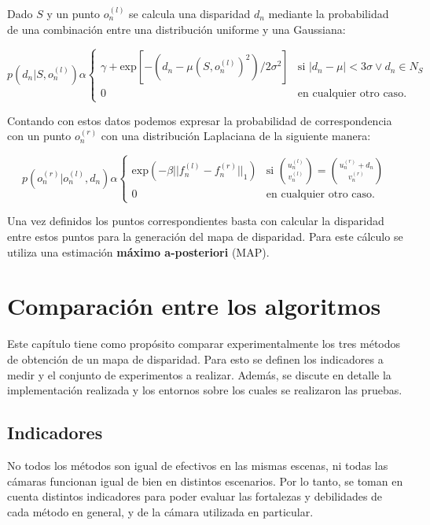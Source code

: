 \documentclass[11pt,a4paper,titlepage]{article}
\begin{document}
Dado $S$ y un punto $o_n^{(l)}$ se calcula una disparidad $d_n$ mediante la probabilidad de una combinación entre una distribución uniforme y una Gaussiana:

\[
	p(d_{n}|S,o_{n}^{(l)})\alpha
	\begin{cases}
	  \gamma + \text{exp} [ - (d_{n} - \mu(S,o_{n}^{(l)})^{2}) / 2 \sigma^{2} ] & \text{si } |d_{n} - \mu| < 3\sigma \vee d_{n} \in N_{S} \\
	  0 & \text{en cualquier otro caso}.
	\end{cases}
\]


Contando con estos datos podemos expresar la probabilidad de correspondencia con un punto $o_n^{(r)}$ con una distribución Laplaciana de la siguiente manera:

\[
	p(o_{n}^{(r)}|o_{n}^{(l)},d_{n})\alpha
	\begin{cases}
	  \text{exp} ( - \beta || f_{n}^{(l)} - f_{n}^{(r)} ||_{1}) & \text{si } \binom{u_{n}^{(l)}}{v_{n}^{(l)}} = \binom{u_{n}^{(r)} + d_{n}}{v_{n}^{(r)}}\\
	  0 & \text{en cualquier otro caso}.
	\end{cases}
\]

Una vez definidos los puntos correspondientes basta con calcular la disparidad entre estos puntos para la generación del mapa de disparidad. Para este cálculo se utiliza una estimación \textbf{máximo a-posteriori} (MAP).

\newpage

\section{Comparación entre los algoritmos}

Este capítulo tiene como propósito comparar experimentalmente los tres métodos de obtención de un mapa de disparidad. Para esto se definen los indicadores a medir y el conjunto de experimentos a realizar. Además, se discute en detalle la implementación realizada y los entornos sobre los cuales se realizaron las pruebas.

\subsection{Indicadores}

No todos los métodos son igual de efectivos en las mismas escenas, ni todas las cámaras funcionan igual de bien en distintos escenarios. Por lo tanto, se toman en cuenta distintos indicadores para poder evaluar las fortalezas y debilidades de cada método en general, y de la cámara utilizada en particular.
\end{document}
